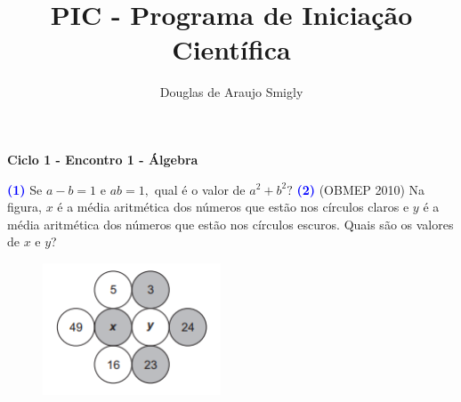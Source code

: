 \documentclass[12pt, a4paper]{article}
\title{PIC - Programa de Iniciação Científica}
\author{Douglas de Araujo Smigly}
\date{}
\begin{document}
\maketitle
\begin{center}
\large\textbf{\textcolor{Floresta}{Ciclo 1 - Encontro 1 - Álgebra}}\\
\end{center}
\textcolor{blue}{\bf(1)} Se $a - b = 1$ e $ab = 1,$ qual é o valor de $a^2 + b^2?$
\newline\newline
\textcolor{blue}{\bf(2)} (OBMEP 2010) Na figura, $x$ é a média aritmética dos números que estão nos círculos claros e $y$ é a média aritmética dos números que estão nos círculos escuros. Quais são os valores de $x$ e $y$?

\begin{figure}[!h]
    \centering
    \includegraphics{Figuras/ex2enc1.png}
\end{figure}
\end{document}
